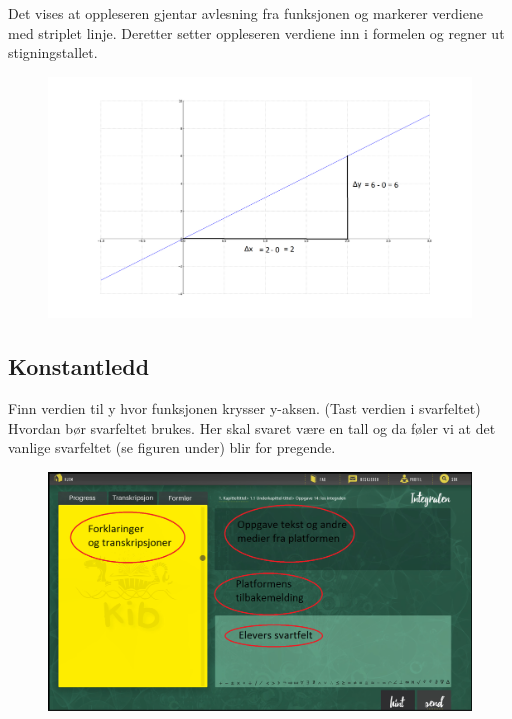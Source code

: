 \documentclass[12pt,twoside,onecolumn]{article}
\begin{document}
\begin{Exercise}
{\color{PineGreen} Det vises at oppleseren gjentar avlesning fra funksjonen og markerer verdiene med striplet linje. Deretter setter oppleseren verdiene inn i formelen og regner ut stigningstallet.}
\begin{figure}[h!]
\centering
\includegraphics[scale = 0.3]{figures/stigningstalleksempelet.png}
\end{figure}
\end{Exercise}

\newpage
\newpage
\newpage
\subsection*{Konstantledd}

\begin{Exercise}
Finn verdien til y hvor funksjonen krysser y-aksen. (Tast verdien i svarfeltet) {\color{Cerulean} Hvordan bør svarfeltet brukes. Her skal svaret være en tall og da føler vi at det vanlige svarfeltet (se figuren under) blir for pregende.}
\begin{figure}[h!]
\centering
\includegraphics[scale = 0.3]{figures/Platform_explained.png}
\end{figure}
\end{Exercise}
\end{document}
